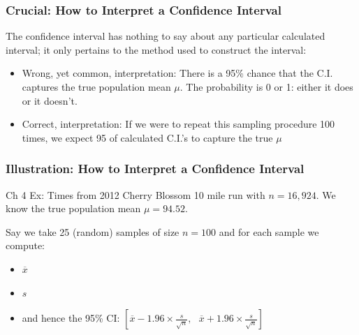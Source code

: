 \documentclass[handout]{beamer}
\newcommand{\blue}[1]{\textcolor{blue2}{#1}}
\newcommand{\xbar}{\overline{x}}
\begin{document}
\begin{frame}
\frametitle{Crucial: How to Interpret a Confidence Interval}
The confidence interval has nothing to say about any particular calculated interval; it only pertains to the \blue{method} used to construct the interval:
\vskip 0.25cm
\begin{itemize}
\pause \item\blue{Wrong, yet common, interpretation}:  There is a 95\% chance that the C.I. captures the true population mean $\mu$.  \pause The probability is 0 or 1: either it does or it doesn't.  
\pause \item\blue{Correct, interpretation}:  If we were to repeat this sampling procedure 100 times, we expect 95 of calculated C.I.'s to capture the true $\mu$
\end{itemize}
 
\end{frame}


\begin{frame}
\frametitle{Illustration:  How to Interpret a Confidence Interval}
Ch 4 Ex: Times from 2012 Cherry Blossom 10 mile run with $n=16,924$.  We know the \blue{true} population mean $\mu=94.52$.

\vspace{0.5cm}

\pause Say we take 25 (random) samples of size $n=100$ and for each sample we compute:
\begin{itemize}
\item $\xbar$
\item $s$
\item and hence the 95\% CI:  $\left[
\overline{x} - 1.96 \times\frac{s}{\sqrt n}, \mbox{  }
\overline{x} + 1.96 \times\frac{s}{\sqrt n}
\right]$
\end{itemize}
\end{frame}
\end{document}
